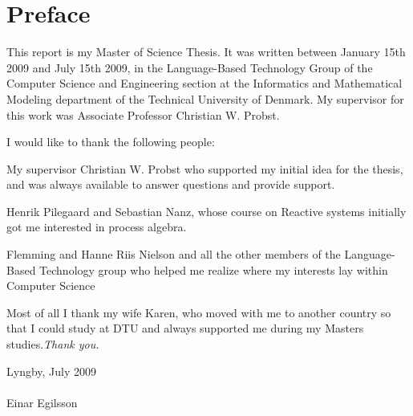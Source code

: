 \chapter{Preface}

This report is my Master of Science Thesis. It was written between
January 15th 2009 and July 15th 2009, in the Language-Based Technology
Group of the Computer Science and Engineering section at the Informatics
and Mathematical Modeling department of the Technical University of
Denmark. My supervisor for this work was Associate Professor Christian
W. Probst.

I would like to thank the following people:

My supervisor Christian W. Probst who supported my initial
idea for the thesis, and was always available to answer
questions and provide support.
	
Henrik Pilegaard and Sebastian Nanz, whose course on Reactive systems
initially got me interested in process algebra.
	
Flemming and Hanne Riis Nielson and all the other members of the
Language-Based Technology group who helped me realize where
my interests lay within Computer Science
	
Most of all I thank my wife Karen, who moved with me to another country 
so that I could study at DTU and always supported me during my Masters 
studies.\it{Thank you}.
	

\vspace{20mm}
\mbox{}\hfill
\begin{minipage}[t]{80mm}
  Lyngby, July 2009
  \\ \\
  Einar Egilsson
\end{minipage}
